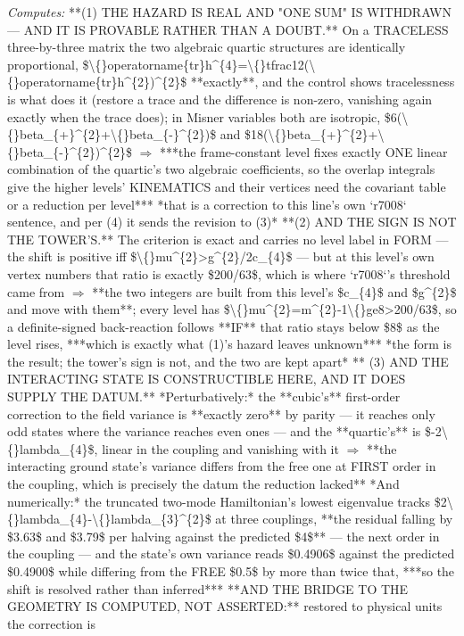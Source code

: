 \begin{description}
\emph{Computes:} **(1) THE HAZARD IS REAL AND "ONE SUM" IS WITHDRAWN --- AND IT IS PROVABLE RATHER THAN A DOUBT.** On a TRACELESS three-by-three matrix the two algebraic quartic structures are identically proportional, \$\textbackslash\{\}operatorname\{tr\}h\textasciicircum{}\{4\}=\textbackslash\{\}tfrac12(\textbackslash\{\}operatorname\{tr\}h\textasciicircum{}\{2\})\textasciicircum{}\{2\}\$ **exactly**, and the control shows tracelessness is what does it (restore a trace and the difference is non-zero, vanishing again exactly when the trace does); in Misner variables both are isotropic, \$6(\textbackslash\{\}beta\_\{+\}\textasciicircum{}\{2\}+\textbackslash\{\}beta\_\{-\}\textasciicircum{}\{2\})\$ and \$18(\textbackslash\{\}beta\_\{+\}\textasciicircum{}\{2\}+\textbackslash\{\}beta\_\{-\}\textasciicircum{}\{2\})\textasciicircum{}\{2\}\$ \ensuremath{\Rightarrow} ***the frame-constant level fixes exactly ONE linear combination of the quartic's two algebraic coefficients, so the overlap integrals give the higher levels' KINEMATICS and their vertices need the covariant table or a reduction per level***  *that is a correction to this line's own `r7008` sentence, and per (4) it sends the revision to (3)*  **(2) AND THE SIGN IS NOT THE TOWER'S.** The criterion is exact and carries no level label in FORM --- the shift is positive iff \$\textbackslash\{\}mu\textasciicircum{}\{2\}>g\textasciicircum{}\{2\}/2c\_\{4\}\$ --- but at this level's own vertex numbers that ratio is exactly \$200/63\$, which is where `r7008`'s threshold came from \ensuremath{\Rightarrow} **the two integers are built from this level's \$c\_\{4\}\$ and \$g\textasciicircum{}\{2\}\$ and move with them**; every level has \$\textbackslash\{\}mu\textasciicircum{}\{2\}=m\textasciicircum{}\{2\}-1\textbackslash\{\}ge8>200/63\$, so a definite-signed back-reaction follows **IF** that ratio stays below \$8\$ as the level rises, ***which is exactly what (1)'s hazard leaves unknown***  *the form is the result; the tower's sign is not, and the two are kept apart*  ** (3) AND THE INTERACTING STATE IS CONSTRUCTIBLE HERE, AND IT DOES SUPPLY THE DATUM.** *Perturbatively:* the **cubic's** first-order correction to the field variance is **exactly zero** by parity --- it reaches only odd states where the variance reaches even ones --- and the **quartic's** is \$-2\textbackslash\{\}lambda\_\{4\}\$, linear in the coupling and vanishing with it \ensuremath{\Rightarrow} **the interacting ground state's variance differs from the free one at FIRST order in the coupling, which is precisely the datum the reduction lacked**  *And numerically:* the truncated two-mode Hamiltonian's lowest eigenvalue tracks \$2\textbackslash\{\}lambda\_\{4\}-\textbackslash\{\}lambda\_\{3\}\textasciicircum{}\{2\}\$ at three couplings, **the residual falling by \$3.63\$ and \$3.79\$ per halving against the predicted \$4\$** --- the next order in the coupling --- and the state's own variance reads \$0.4906\$ against the predicted \$0.4900\$ while differing from the FREE \$0.5\$ by more than twice that, ***so the shift is resolved rather than inferred***  **AND THE BRIDGE TO THE GEOMETRY IS COMPUTED, NOT ASSERTED:** restored to physical units the correction is 
\end{description}
